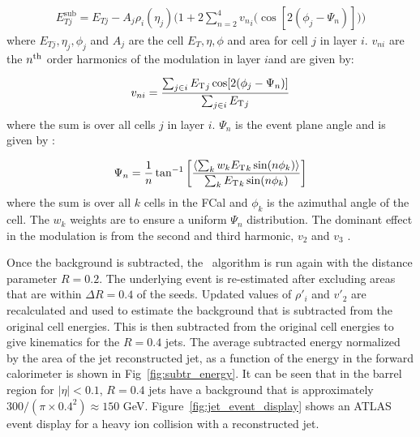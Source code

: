 \begin{align}
E_{Tj}^{\mathrm{sub}} = E_{Tj} - A_j \rho_i (\eta_j) \Big(1+2 \sum_{n=2}^{4} {v_{n}}_i \big(\cos[2(\phi_j-\Psi_n)] \big) \Big)
\end{align}
where $E_{Tj} , \eta_j, \phi_j$ and $A_j$ are the cell $E_T, \eta, \phi$ and area for cell $j$ in layer $i$.
$v_{ni}$ are the $n^{\rm th}$ order harmonics of the modulation in layer $i$and are given by:

\begin{align}
v_{ni} = \frac{\sum_{j \in i} \mbox{$E_{\mathrm{T}}$}_j \cos[2(\phi_j-\Psi_n)]}{\sum_{j \in i} \mbox{$E_{\mathrm{T}}$}_j}
\end{align}
where the sum is over all cells $j$ in layer $i$.
$\Psi_n$ is the event plane angle and is given by \cite{ATLAS:2012at}:

\begin{align}
\Psi_n = \frac{1}{n} \tan^{-1} \left[ \frac{\langle \sum_k w_k \mbox{$E_{\mathrm{T}}$}_k \sin(n\phi_k) \rangle}{\sum_k \mbox{$E_{\mathrm{T}}$}_k \sin(n\phi_k)} \right]
\end{align}
where the sum is over all $k$ cells in the FCal and $\phi_k$ is the azimuthal angle of the cell.
The $w_k$ weights are to ensure a uniform $\Psi_n$ distribution.
The dominant effect in the modulation is from the second and third harmonic, $v_2$ and $v_3$ \cite{ATLAS:2012at}.

Once the background is subtracted, the \antikt\ algorithm is run again with the distance parameter $R = 0.2$.
The underlying event is re-estimated after excluding areas that are within $\Delta R = 0.4$ of the seeds.
Updated values of $\rho{'}_i$ and $v{'}_2$ are recalculated and used to estimate the background that is subtracted from the original cell energies.
This is then subtracted from the original cell energies to give kinematics for the $R= 0.4$ jets.
The average subtracted energy normalized by the area of the jet reconstructed jet, as a function of the energy in the forward calorimeter is shown in Fig~\ref{fig:subtr_energy}.
It can be seen that in the barrel region for $|\eta| < 0.1$, $R=0.4$ jets have a background that is approximately $300/(\pi\times 0.4^2) \approx 150$ GeV.
Figure~\ref{fig:jet_event_display} shows an ATLAS event display for a heavy ion collision with a reconstructed jet.


